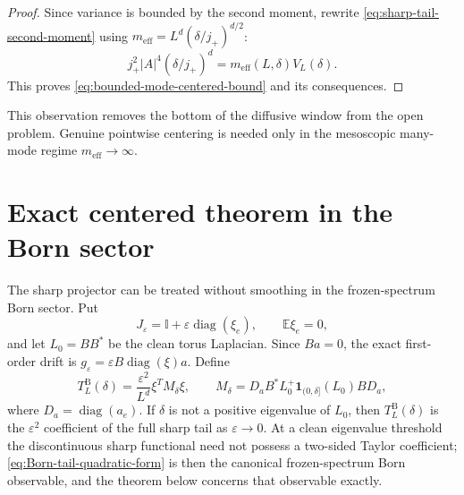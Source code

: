 \documentclass[11pt]{article}
\theoremstyle{definition}
\theoremstyle{remark}
\newcommand{\Id}{\mathbb I}
\newcommand{\E}{\mathbb E}
\newcommand{\diag}{\operatorname{diag}}
\newcommand{\abs}[1]{\left\lvert #1\right\rvert}
\newcommand{\eps}{\varepsilon}
\begin{document}
\begin{proof}
Since variance is bounded by the second moment, rewrite
\eqref{eq:sharp-tail-second-moment} using
$m_{\mathrm{eff}}=L^d(\delta/j_+)^{d/2}$:
\[
 j_+^2\abs A^4(\delta/j_+)^d
 =m_{\mathrm{eff}}(L,\delta)V_L(\delta).
\]
This proves \eqref{eq:bounded-mode-centered-bound} and its consequences.
\end{proof}

This observation removes the bottom of the diffusive window from the open
problem.  Genuine pointwise centering is needed only in the mesoscopic
many-mode regime $m_{\mathrm{eff}}\to\infty$.

\section{Exact centered theorem in the Born sector}

The sharp projector can be treated without smoothing in the frozen-spectrum
Born sector.  Put
\begin{equation}
 J_\eps=\Id+\eps\diag(\xi_e),
 \qquad \E\xi_e=0,
 \label{eq:Born-conductance}
\end{equation}
and let $L_0=BB^*$ be the clean torus Laplacian.  Since $Ba=0$, the exact
first-order drift is $g_\eps=\eps B\diag(\xi)a$.  Define
\begin{equation}
 T_L^{\mathrm B}(\delta)
 =\frac{\eps^2}{L^d}\xi^TM_\delta\xi,
 \qquad
 M_\delta=D_aB^*L_0^+\bm1_{(0,\delta]}(L_0)BD_a,
 \label{eq:Born-tail-quadratic-form}
\end{equation}
where $D_a=\diag(a_e)$.  If $\delta$ is not a positive eigenvalue of
$L_0$, then $T_L^{\mathrm B}(\delta)$ is the $\eps^2$ coefficient of the full
sharp tail as $\eps\to0$.  At a clean eigenvalue threshold the discontinuous
sharp functional need not possess a two-sided Taylor coefficient;
\eqref{eq:Born-tail-quadratic-form} is then the canonical frozen-spectrum Born
observable, and the theorem below concerns that observable exactly.
\end{document}
